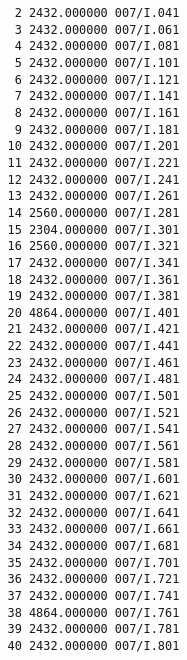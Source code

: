 \documentclass[10pt]{article}
\begin{document}
\begin{verbatim}
    2 2432.000000 007/I.041
    3 2432.000000 007/I.061
    4 2432.000000 007/I.081
    5 2432.000000 007/I.101
    6 2432.000000 007/I.121
    7 2432.000000 007/I.141
    8 2432.000000 007/I.161
    9 2432.000000 007/I.181
   10 2432.000000 007/I.201
   11 2432.000000 007/I.221
   12 2432.000000 007/I.241
   13 2432.000000 007/I.261
   14 2560.000000 007/I.281
   15 2304.000000 007/I.301
   16 2560.000000 007/I.321
   17 2432.000000 007/I.341
   18 2432.000000 007/I.361
   19 2432.000000 007/I.381
   20 4864.000000 007/I.401
   21 2432.000000 007/I.421
   22 2432.000000 007/I.441
   23 2432.000000 007/I.461
   24 2432.000000 007/I.481
   25 2432.000000 007/I.501
   26 2432.000000 007/I.521
   27 2432.000000 007/I.541
   28 2432.000000 007/I.561
   29 2432.000000 007/I.581
   30 2432.000000 007/I.601
   31 2432.000000 007/I.621
   32 2432.000000 007/I.641
   33 2432.000000 007/I.661
   34 2432.000000 007/I.681
   35 2432.000000 007/I.701
   36 2432.000000 007/I.721
   37 2432.000000 007/I.741
   38 4864.000000 007/I.761
   39 2432.000000 007/I.781
   40 2432.000000 007/I.801
\end{verbatim}
\end{document}
